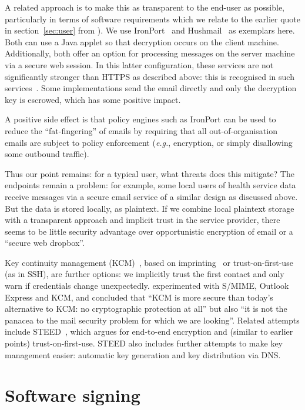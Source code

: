 \documentclass{article}
\def\citeN{\citet}
\def\cite{\citep}
\newcommand{\eg}{\textit{e.g.}}
\begin{document}
A related approach is to make this as transparent to the end-user as
possible, particularly in terms of software requirements which we relate to
the earlier quote in section~\ref{sec:user} from \citeN{Kapadia07}).  We use
IronPort~\cite{mIronport1} and Hushmail~\cite{mHushmail2} as exemplars here.  Both can use a Java applet
so that decryption occurs on the client machine.  Additionally, both
offer an option for processing messages on the server machine via a secure web
session.  In this latter configuration, these services are not
significantly stronger than HTTPS as described above: this is
recognised in such services~\cite{mHushmail1,mHushmail2,mWired07}.
Some implementations send the email directly and only the decryption
key is escrowed, which has some positive impact.

A positive side effect is that policy engines such as IronPort can be
used to reduce the ``fat-fingering'' of emails by requiring that all
out-of-organisation emails are subject to policy enforcement (\eg,
encryption, or simply disallowing some outbound traffic).

Thus our point remains: for a typical user, what threats does this
mitigate?  The endpoints remain a problem: for example, some local
users of health service data receive messages via a secure email service of
a similar design as discussed above.  But the data is stored locally,
as plaintext.
If we combine local plaintext storage with a transparent approach and
implicit trust in the service provider, there seems to be little
security advantage over opportunistic encryption of email or a ``secure
web dropbox''.

Key continuity management (KCM)~\cite{Gutmann04b}, based on
imprinting~\cite{Stajano+99b} or trust-on-first-use (as in SSH), are further options: we implicitly
trust the first contact and only warn if credentials change
unexpectedly.  \citeN{Garfinkel+05} experimented with S/MIME, Outlook
Express and KCM, and concluded that ``KCM is more secure than today's
alternative to KCM: no cryptographic protection at all'' but also ``it
is not the panacea to the mail security problem for which we are
looking''.  
Related attempts include STEED~\cite{Koch+11}, which argues for end-to-end encryption and (similar to earlier points) trust-on-first-use.  STEED also includes further attempts to make key management easier: automatic key generation and key distribution via DNS.



\section{Software signing}
\end{document}
